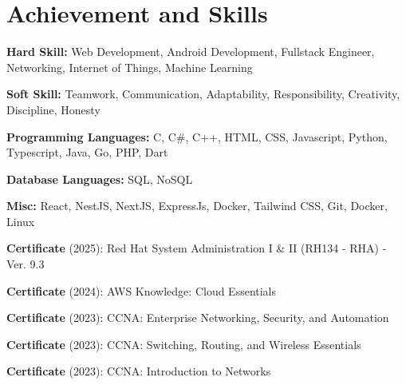 \documentclass[../main.tex]{subfiles}
\begin{document}
\section{Achievement and Skills}
\begin{highlights}
    \item \textbf{Hard Skill:} Web Development, Android Development, Fullstack Engineer, Networking, Internet of Things, Machine Learning
    \item \textbf{Soft Skill:} Teamwork, Communication, Adaptability, Responsibility, Creativity, Discipline, Honesty
    \item \textbf{Programming Languages:} C, C\#, C++, HTML, CSS, Javascript, Python, Typescript, Java, Go, PHP, Dart
    \item \textbf{Database Languages:} SQL, NoSQL
    \item \textbf{Misc:} React, NestJS, NextJS, ExpressJs, Docker, Tailwind CSS, Git, Docker, Linux
    \item \textbf{Certificate} (2025): Red Hat System Administration I \& II (RH134 - RHA) - Ver. 9.3
    \item \textbf{Certificate} (2024): AWS Knowledge: Cloud Essentials
    \item \textbf{Certificate} (2023): CCNA: Enterprise Networking, Security, and Automation
    \item \textbf{Certificate} (2023): CCNA: Switching, Routing, and Wireless Essentials
    \item \textbf{Certificate} (2023): CCNA: Introduction to Networks
\end{highlights}
\end{document}
